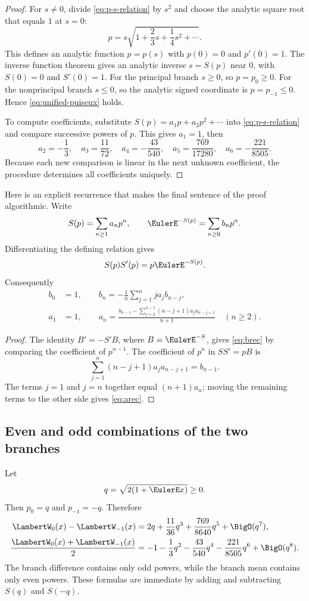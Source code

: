 \documentclass[11pt]{article}
\theoremstyle{remark}
\newcommand{\Wz}{\LambertW_{0}}
\newcommand{\Wm}{\LambertW_{-1}}
\begin{document}
\begin{proof}
For \(s\neq0\), divide \eqref{eq:p-s-relation} by \(s^2\) and choose the
analytic square root that equals \(1\) at \(s=0\):
\[
 p=s\sqrt{1+\frac23s+\frac14s^2+\cdots}.
\]
This defines an analytic function \(p=p(s)\) with \(p(0)=0\) and
\(p'(0)=1\).  The inverse function theorem gives an analytic inverse
\(s=S(p)\) near \(0\), with \(S(0)=0\) and \(S'(0)=1\).
For the principal branch \(s\geq0\), so \(p=p_0\geq0\).  For the
nonprincipal branch \(s\leq0\), so the analytic signed coordinate is
\(p=p_{-1}\leq0\).  Hence \eqref{eq:unified-puiseux} holds.

To compute coefficients, substitute
\(S(p)=a_1p+a_2p^2+\cdots\) into \eqref{eq:p-s-relation} and compare
successive powers of \(p\).  This gives \(a_1=1\), then
\[
 a_2=-\frac13,\quad a_3=\frac{11}{72},\quad
 a_4=-\frac{43}{540},\quad
 a_5=\frac{769}{17280},\quad
 a_6=-\frac{221}{8505}.
\]
Because each new comparison is linear in the next unknown coefficient, the
procedure determines all coefficients uniquely.
\end{proof}

Here is an explicit recurrence that makes the final sentence of the proof
algorithmic.  Write
\[
 S(p)=\sum_{n\geq1}a_np^n,\qquad
 \EulerE^{-S(p)}=\sum_{n\geq0}b_np^n.
\]
Differentiating the defining relation gives
\[
       S(p)S'(p)=p\EulerE^{-S(p)}.
\]
Consequently
\begin{align}
 b_0&=1,\qquad
 b_n=-\frac1n\sum_{j=1}^n j a_jb_{n-j},\label{eq:brec}\\
 a_1&=1,\qquad
 a_n=\frac{b_{n-1}
 -\displaystyle\sum_{j=2}^{n-1}(n-j+1)a_ja_{n-j+1}}
 {n+1}\quad(n\geq2).\label{eq:arec}
\end{align}

\begin{proof}
The identity \(B'=-S'B\), where \(B=\EulerE^{-S}\), gives
\eqref{eq:brec} by comparing the coefficient of \(p^{n-1}\).
The coefficient of \(p^n\) in \(SS'=pB\) is
\[
 \sum_{j=1}^n(n-j+1)a_ja_{n-j+1}=b_{n-1}.
\]
The terms \(j=1\) and \(j=n\) together equal \((n+1)a_n\); moving the
remaining terms to the other side gives \eqref{eq:arec}.
\end{proof}

\subsection{Even and odd combinations of the two branches}

Let
\[
       q=\sqrt{2(1+\EulerE x)}\geq0.
\]
Then \(p_0=q\) and \(p_{-1}=-q\).  Therefore
\begin{align}
 \Wz(x)-\Wm(x)
 &=2q+\frac{11}{36}q^3+\frac{769}{8640}q^5+\BigO(q^7),
 \label{eq:branchdifference}\\
 \frac{\Wz(x)+\Wm(x)}2
 &=-1-\frac13q^2-\frac{43}{540}q^4
   -\frac{221}{8505}q^6+\BigO(q^8).
 \label{eq:branchmean}
\end{align}
The branch difference contains only odd powers, while the branch mean
contains only even powers.  These formulas are immediate by adding and
subtracting \(S(q)\) and \(S(-q)\).
\end{document}
